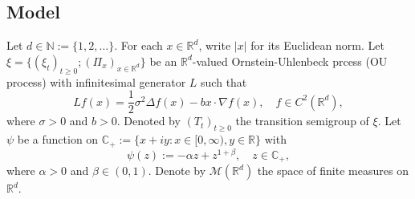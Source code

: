 \documentclass[12pt, a4paper]{amsart}
\theoremstyle{definition}
\numberwithin{equation}{section}
\begin{document}
\subsection{Model}
Let $d \in \mathbb N:= \{1,2,\dots\}$.
For each $x\in \mathbb{R}^d$, write $|x|$ for its Euclidean norm. 
Let $\xi=\{(\xi_t)_{t\geq 0}; (\Pi_x)_{x\in \mathbb R^d}\}$ be an $\mathbb R^d$-valued Ornstein-Uhlenbeck prcess (OU process) with infinitesimal generator $L$ such that
\begin{equation}\label{generatior}
    Lf(x)
    = \frac{1}{2}\sigma^2\Delta f(x)-b x \cdot \nabla f(x), 
    \quad f \in C^2(\mathbb{R}^d), 
\end{equation}
where $\sigma>0$ and $b>0$. 
Denoted by $(T_t)_{t\geq 0}$ the transition semigroup of $\xi$.
Let $\psi$ be a function on $\mathbb C_+:= \{x+iy: x\in [0,\infty), y\in \mathbb R\}$ with
\begin{equation}\label{mechanism}
    \psi(z)
    := - \alpha z + z^{1+\beta}, 
    \quad z \in \mathbb C_+,
\end{equation}
where $\alpha > 0$ and $\beta \in (0,1) $.
Denote by $\mathcal{M}(\mathbb{R}^d)$ the space of finite measures on $\mathbb{R}^d$.
\end{document}
